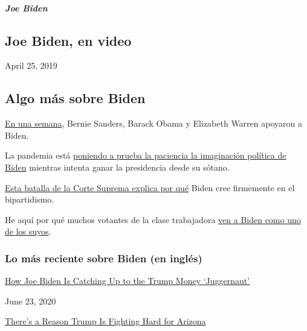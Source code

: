 \hypertarget{joe-biden-1}{%
\subparagraph{Joe Biden}\label{joe-biden-1}}

\hypertarget{joe-biden-en-video}{%
\subsection{Joe Biden, en video}\label{joe-biden-en-video}}

April 25, 2019

\hypertarget{algo-muxe1s-sobre-biden}{%
\subsection{Algo más sobre Biden}\label{algo-muxe1s-sobre-biden}}

\href{https://www.nytimes3xbfgragh.onion/2020/04/15/us/politics/elizabeth-warren-endorse-biden.html?action=click\&module=RelatedLinks\&pgtype=Article}{En
una semana}, Bernie Sanders, Barack Obama y Elizabeth Warren apoyaron a
Biden.

La pandemia está
\href{https://www.nytimes3xbfgragh.onion/2020/04/25/us/politics/joe-biden-coronavirus-quarantine.html}{poniendo
a prueba la paciencia la imaginación política de Biden} mientras intenta
ganar la presidencia desde su sótano.

\href{https://www.nytimes3xbfgragh.onion/2019/09/07/us/politics/joe-biden-bork-supreme-court.html}{Esta
batalla de la Corte Suprema explica por qué} Biden cree firmemente en el
bipartidismo.

He aquí por qué muchos votantes de la clase trabajadora
\href{https://www.nytimes3xbfgragh.onion/2019/11/19/us/politics/joe-biden-working-class.html}{ven
a Biden como uno de los suyos}.

\hypertarget{lo-muxe1s-reciente-sobre-biden-en-ingluxe9s}{%
\subsubsection{Lo más reciente sobre Biden (en
inglés)}\label{lo-muxe1s-reciente-sobre-biden-en-ingluxe9s}}

\href{https://www.nytimes3xbfgragh.onion/2020/06/23/us/politics/biden-trump-2020-fundraising.html}{How
Joe Biden Is Catching Up to the Trump Money `Juggernaut'}

June 23, 2020

\href{https://www.nytimes3xbfgragh.onion/2020/06/23/us/politics/arizona-2020-election-democrats-republicans.html}{There's
a Reason Trump Is Fighting Hard for Arizona}

